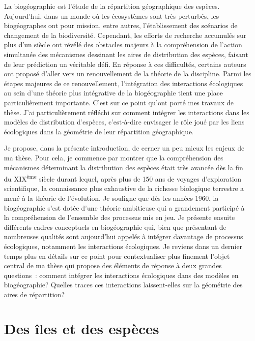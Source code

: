 La biogéographie est l'étude de la répartition géographique des espèces.
Aujourd'hui, dans un monde où les écosystèmes sont très perturbés, les
biogéographes ont pour mission, entre autres, l'établissement des
scénarios de changement de la biodiversité. Cependant, les efforts de
recherche accumulés sur plus d'un siècle ont révélé des obstacles
majeurs à la compréhension de l'action simultanée des mécanismes
dessinant les aires de distribution des espèces, faisant de leur
prédiction un véritable défi. En réponse à ces difficultés, certains
auteurs ont proposé d'aller vers un renouvellement de la théorie de la
discipline. Parmi les étapes majeures de ce renouvellement,
l'intégration des interactions écologiques au sein d'une théorie plus
intégrative de la biogéographie tient une place particulièrement
importante. C'est sur ce point qu'ont porté mes travaux de thèse. J'ai
particulièrement réfléchi sur comment intégrer les interactions dans les
modèles de distribution d'espèces, c'est-à-dire envisager le rôle joué
par les liens écologiques dans la géométrie de leur répartition
géographique.

Je propose, dans la présente introduction, de cerner un peu mieux les
enjeux de ma thèse. Pour cela, je commence par montrer que la
compréhension des mécanismes déterminant la distribution des espèces
était très avancée dès la fin du XIX\textsuperscript{ème} siècle durant
lequel, après plus de 150 ans de voyages d'exploration scientifique, la
connaissance plus exhaustive de la richesse biologique terrestre a mené
à la théorie de l'évolution. Je souligne que dès les années 1960, la
biogéographie s'est dotée d'une théorie ambitieuse qui a grandement
participé à la compréhension de l'ensemble des processus mis en jeu. Je
présente ensuite différents cadres conceptuels en biogéographie qui,
bien que présentant de nombreuses qualités sont aujourd'hui appelés à
intégrer davantage de processus écologiques, notamment les interactions
écologiques. Je reviens dans un dernier temps plus en détails sur ce
point pour contextualiser plus finement l'objet central de ma thèse qui
propose des éléments de réponse à deux grandes questions~: comment
intégrer les interactions écologiques dans des modèles en biogéographie?
Quelles traces ces interactions laissent-elles sur la géométrie des
aires de répartition?

\section*{Des îles et des espèces}\label{des-uxeeles-et-des-espuxe8ces}

